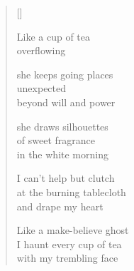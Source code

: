 \documentclass[11pt,a4paper]{article}
\begin{document}
\thispagestyle{empty}

\poemtitle{}

\settowidth{\versewidth}{Like a make-believe ghost}

\bigskip

\begin{verse}[\versewidth]

Like a cup of tea\\
overflowing

she keeps going places\\
unexpected\\
beyond will and power

she draws silhouettes\\
of sweet fragrance\\
in the white morning

I can't help but clutch\\
at the burning tablecloth\\
and drape my heart

Like a make-believe ghost \\
I haunt every cup of tea\\
with my trembling face
\end{verse}
\end{document}
